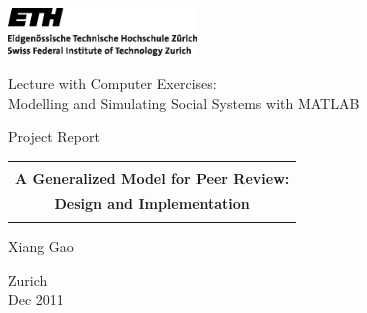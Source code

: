\def\CTeXPreproc{Created by ctex v0.2.14, don't edit!}
\thispagestyle{empty}

\begin{center}
\includegraphics[width=5cm]{ETHlogo.eps}

\bigskip


\bigskip


\bigskip


\LARGE{ 	Lecture with Computer Exercises:\\ }
\LARGE{ Modelling and Simulating Social Systems with MATLAB\\}

\bigskip

\bigskip

\small{Project Report}\\

\bigskip

\bigskip

\bigskip

\bigskip


\begin{tabular}{|c|}
\hline
\\
\textbf{\LARGE{A Generalized Model for Peer Review:}}\\
\textbf{\LARGE{Design and Implementation}}\\
\\
\hline
\end{tabular}
\bigskip

\bigskip

\bigskip

\LARGE{Xiang Gao}



\bigskip

\bigskip

\bigskip

\bigskip

\bigskip

\bigskip

\bigskip

\bigskip

Zurich\\
Dec 2011\\

\end{center}


